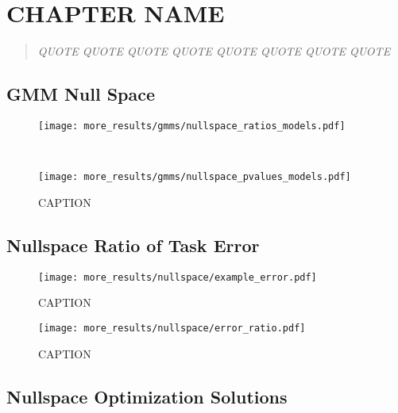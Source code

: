 \documentclass[../main.tex]{subfiles}
\begin{document}
\chapter{CHAPTER NAME}\label{chap:LABEL}

\bigskip
\begin{quote}
\emph{QUOTE QUOTE QUOTE QUOTE QUOTE QUOTE QUOTE QUOTE }

\end{quote}

\cleardoublepage%

\section{GMM Null Space}

\begin{figure}[H]
  \centering
  \begin{minipage}{0.49\textwidth}
    \texttt{[image: more\_results/gmms/nullspace\_ratios\_models.pdf]}
    \subcaption{}
  \end{minipage}\\%
  \begin{minipage}{0.49\textwidth}
    \texttt{[image: more\_results/gmms/nullspace\_pvalues\_models.pdf]}
    \subcaption{}
  \end{minipage}
  \caption[Nullspace activity for GMMs]{CAPTION}\label{fig:nullspace_gmms}
\end{figure}


\section{Nullspace Ratio of Task Error}

\begin{figure}[H]
  \centering
    \texttt{[image: more\_results/nullspace/example\_error.pdf]}
    \caption[Example Error]{CAPTION}\label{fig:example_error}
\end{figure}

\begin{figure}[H]
  \centering
    \texttt{[image: more\_results/nullspace/error\_ratio.pdf]}
    \caption[Error Nullspace]{CAPTION}\label{fig:error_nullspace_subjects}
\end{figure}


\section{Nullspace Optimization Solutions}
\end{document}
